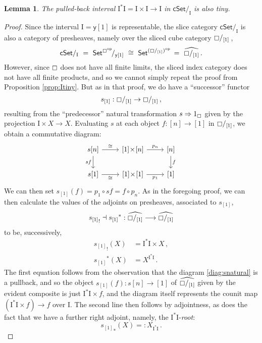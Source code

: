 \documentclass[12pt]{article}
\newcommand{\C}{\ensuremath{\boxempty}}
\newcommand{\psh}[1]{\ensuremath{\mathsf{Set}^{#1^{\mathrm{op}}}}}
\newcommand{\cSet}{\ensuremath{\mathsf{cSet}}}
\newcommand{\y}{\ensuremath{\mathsf{y}}} %
\renewcommand{\to}{\ensuremath{\rightarrow}}
\newcommand{\too}{\ensuremath{\longrightarrow}}
\newcommand{\I}{\ensuremath{\mathrm{I}}}
\newtheorem{lemma}[theorem]{Lemma}
\theoremstyle{remark}
\theoremstyle{definition}
\begin{document}
\begin{lemma}\label{lemma:tinyslicedI}
The pulled-back interval $\I^*\I = \I\times\I\to \I$ in $\cSet/_\I$ is also tiny.
\end{lemma}
\begin{proof}
Since the interval $\I = \y[1]$ is representable, the slice category $\cSet/_\I$ is also a category of presheaves, namely over the sliced cube category $\C/_{[1]}$\,,
\[
\cSet/_\I \ =\ {\psh{\C}}\!/_{\y[1]} \ \cong\ \psh{ (\C/_{[1]}) }\, =\ \widehat{\C/_{[1]}} \,.
\]
However, since $\C$ does not have all finite limits, the sliced index category does not have all finite products, and so we cannot simply repeat the proof from Proposition \ref{prop:Itiny}.  But as in that proof, we do have a ``successor'' functor 
\[
s_{[1]} : \C/_{[1]} \to \C/_{[1]}\,,
\]
resulting from the ``predecessor'' natural transformation $s \Rightarrow 1_\C$ given by the  projection $\I\times X \to X$. Evaluating $s$ at each object $f : [n] \to [1]$ in  $\C/_{[1]}$, we obtain a commutative diagram:
\begin{equation}\label{diag:snatural}
\begin{tikzcd}
s[n]  \ar[d,swap, "{sf}"] \ar[r, "{\cong}" ] & {[1]}\!\times\! {[n]}  \ar[r, "p_n"] & {[n]} \ar[d, "f"] \\  
s[1]  \ar[r, swap, "{\cong}" ] & {[1]}\!\times\! {[1]}  \ar[r, swap, "p_1"] & {[1]}
 \end{tikzcd}
 \end{equation}
We can then set $s_{[1]}(f) = p_1\circ sf = f\circ p_n$. As in the foregoing proof, we can then calculate the values of the adjoints on presheaves, associated to $s_{[1]}$,
 \[
 {s_{[1]}}_! \dashv {s_{[1]}}^* : \widehat{\C/_{[1]}} \too \widehat{\C/_{[1]}} \]
  to be, successively,
 \begin{align*}
 {s_{[1]}}_! (X) &= \I^*\I \times X\,, \\
  {s_{[1]}}^* (X) &= X^{\I^*\I} \,.
 \end{align*}
The first equation follows from the observation that the diagram \eqref{diag:snatural} is a pullback, and so the object $s_{[1]}(f)  : s[n]\to [1]$ of $\widehat{\C/_{[1]}}$ given by the evident composite is just $\I^*\I \times f $, and the diagram itself represents the counit map $(\I^*\I \times f) \to f$ over $\I$.
 The second line then follows by adjointness, as does the fact that we have a further right adjoint, namely, the ${\I^*\I}$-\emph{root}:
 \begin{equation*}
 {s_{[1]}}_* (X) =: X_{\I^*\I} \,.
 \end{equation*}
\end{proof}
\end{document}
